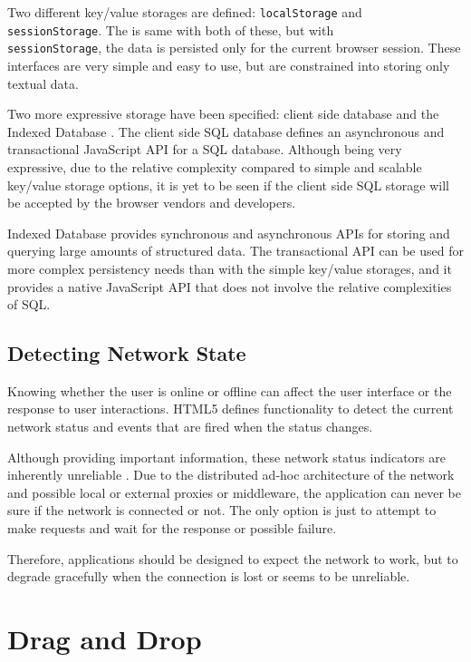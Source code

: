 Two different key/value storages are defined: \texttt{localStorage}
and\\ \texttt{sessionStorage}. The  is same with both of
these, but with\\ \texttt{sessionStorage}, the data is persisted only
for the current browser session. These interfaces are very simple and
easy to use, but are constrained into storing only textual
data. \cite{webstoragedraft}

Two more expressive storage  have been specified: client
side  database \cite{webstoragedraft} and the Indexed
Database \cite{indexedDBdraft}. The client side SQL database defines
an asynchronous and transactional JavaScript API for a SQL
database. Although being very expressive, due to the relative
complexity compared to simple and scalable key/value storage options,
it is yet to be seen if the client side SQL storage will be accepted
by the browser vendors and developers.

Indexed Database provides synchronous and asynchronous APIs for
storing and querying large amounts of structured data. The
transactional API can be used for more complex persistency needs than
with the simple key/value storages, and it provides a native
JavaScript API that does not involve the relative complexities of SQL.

\subsection{Detecting Network State}

Knowing whether the user is online or offline can affect the user
interface or the response to user interactions. HTML5 defines
functionality to detect the current network status and events that are
fired when the status changes. \cite{HTML5draft}

Although providing important information, these network status
indicators are inherently unreliable \cite{HTML5draft}. Due to the
distributed ad-hoc architecture of the network and possible local or
external proxies or middleware, the application can never be sure if
the network is connected or not. The only option is just to attempt to
make requests and wait for the response or possible failure.

Therefore, applications should be designed to expect the network to
work, but to degrade gracefully when the connection is lost or seems
to be unreliable.

\section{Drag and Drop}
\label{section:dragdrop}

